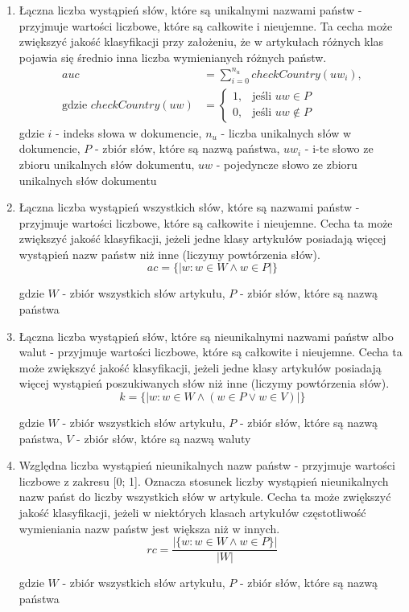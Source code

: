 \documentclass{article}
\begin{document}
\begin{enumerate}[label=c\arabic*.]
  \item Łączna liczba wystąpień słów, które są unikalnymi nazwami państw - przyjmuje wartości liczbowe, które są całkowite i nieujemne. Ta cecha może zwiększyć jakość klasyfikacji przy założeniu, że w artykułach różnych klas pojawia się średnio inna liczba wymienianych różnych państw.
  \begin{subequations} 
\begin{align}
auc &= \sum_{i=0}^{n_u} checkCountry(uw_i), \\
\text{gdzie } checkCountry(uw) &= 
\begin{cases} 
1, & \text{jeśli } uw \in P \\
0, & \text{jeśli } uw \notin P
\end{cases}
\end{align}
\end{subequations}
gdzie  \(i\) - indeks słowa w dokumencie, \(n_u\) - liczba unikalnych słów w dokumencie, \(P\) - zbiór słów, które są nazwą państwa, \(uw_{i}\) - i-te słowo ze zbioru unikalnych słów dokumentu, \(uw\) - pojedyncze słowo ze zbioru unikalnych słów dokumentu

  \item Łączna liczba wystąpień wszystkich słów, które są nazwami państw - przyjmuje wartości liczbowe, które są całkowite i nieujemne. Cecha ta może zwiększyć jakość klasyfikacji, jeżeli jedne klasy artykułów posiadają więcej wystąpień nazw państw niż inne (liczymy powtórzenia słów).
   \begin{equation}
       ac = \{| w: w \in W \land w \in P |\}
   \end{equation}

gdzie \(W\) - zbiór wszystkich słów artykułu, \(P\) - zbiór słów, które są nazwą państwa
  \item Łączna liczba wystąpień słów, które są nieunikalnymi nazwami państw albo walut - przyjmuje wartości liczbowe, które są całkowite i nieujemne. Cecha ta może zwiększyć jakość klasyfikacji, jeżeli jedne klasy artykułów posiadają więcej wystąpień poszukiwanych słów niż inne (liczymy powtórzenia słów).
   \begin{equation}
       k = \{| w: w \in W \land (w \in P \lor w \in V)|\}
   \end{equation}

gdzie \(W\) - zbiór wszystkich słów artykułu, \(P\) - zbiór słów, które są nazwą państwa, \(V\) - zbiór słów, które są nazwą waluty
  \item Względna liczba wystąpień nieunikalnych nazw państw - przyjmuje wartości liczbowe z zakresu [0; 1]. Oznacza stosunek liczby wystąpień nieunikalnych nazw państ do liczby wszystkich słów w artykule. Cecha ta może zwiększyć jakość klasyfikacji, jeżeli w niektórych klasach artykułów częstotliwość wymieniania nazw państw jest większa niż w innych.
\begin{equation}
     rc = \frac{\left| \{ w : w \in W \land w \in P \} \right|}{|W|} 
\end{equation}

gdzie \(W\) - zbiór wszystkich słów artykułu, \(P\) - zbiór słów, które są nazwą państwa
\end{enumerate}\medskip
\end{document}
